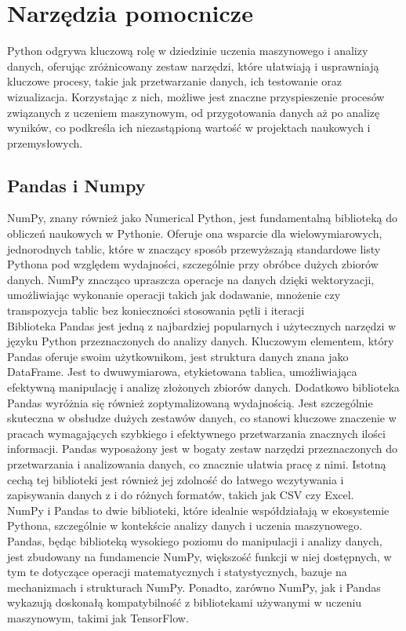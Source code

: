 \documentclass[a4paper,twoside,12pt]{book}
\begin{document}
\section{Narzędzia pomocnicze}
Python odgrywa kluczową rolę w dziedzinie uczenia maszynowego i analizy danych, oferując zróżnicowany zestaw narzędzi, które ułatwiają i usprawniają kluczowe procesy, takie jak przetwarzanie danych, ich testowanie oraz wizualizacja. Korzystając z nich, możliwe jest znaczne przyspieszenie procesów związanych z uczeniem maszynowym, od przygotowania danych aż po analizę wyników, co podkreśla ich niezastąpioną wartość w projektach naukowych i przemysłowych.
\subsection{Pandas i Numpy}
NumPy, znany również jako Numerical Python, jest fundamentalną biblioteką do obliczeń naukowych w Pythonie. Oferuje ona wsparcie dla wielowymiarowych, jednorodnych tablic, które w znaczący sposób przewyższają standardowe listy Pythona pod względem wydajności, szczególnie przy obróbce dużych zbiorów danych. NumPy znacząco upraszcza operacje na danych dzięki wektoryzacji, umożliwiając wykonanie operacji takich jak dodawanie, mnożenie czy transpozycja tablic bez konieczności stosowania pętli i iteracji\\

Biblioteka Pandas jest jedną z najbardziej popularnych i użytecznych narzędzi w języku Python przeznaczonych do analizy danych. Kluczowym elementem, który Pandas oferuje swoim użytkownikom, jest struktura danych znana jako DataFrame. Jest to dwuwymiarowa, etykietowana tablica, umożliwiająca efektywną manipulację i analizę złożonych zbiorów danych. Dodatkowo biblioteka Pandas wyróżnia się również zoptymalizowaną wydajnością. Jest szczególnie skuteczna w obsłudze dużych zestawów danych, co stanowi kluczowe znaczenie w pracach wymagających szybkiego i efektywnego przetwarzania znacznych ilości informacji. Pandas wyposażony jest w bogaty zestaw narzędzi przeznaczonych do przetwarzania i analizowania danych, co znacznie ułatwia pracę z nimi. Istotną cechą tej biblioteki jest również jej zdolność do łatwego wczytywania i zapisywania danych z i do różnych formatów, takich jak CSV czy Excel.\\

NumPy i Pandas to dwie biblioteki, które idealnie współdziałają w ekosystemie Pythona, szczególnie w kontekście analizy danych i uczenia maszynowego. Pandas, będąc biblioteką wysokiego poziomu do manipulacji i analizy danych, jest zbudowany na fundamencie NumPy, większość funkcji w niej dostępnych, w tym te dotyczące operacji matematycznych i statystycznych, bazuje na mechanizmach i strukturach NumPy.
Ponadto, zarówno NumPy, jak i Pandas wykazują doskonałą kompatybilność z bibliotekami używanymi w uczeniu maszynowym, takimi jak TensorFlow.
\newpage
\end{document}
